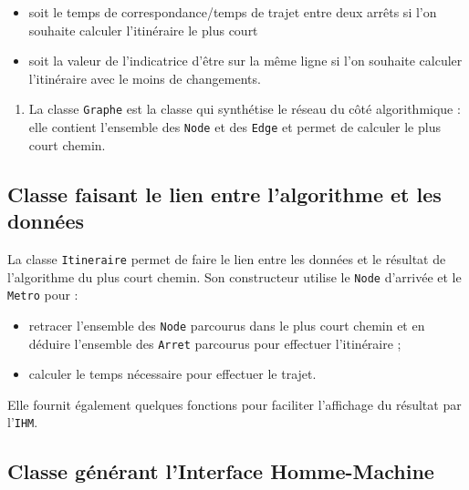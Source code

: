 \documentclass[,french]{article}
\providecommand{\tightlist}{%
  \setlength{\itemsep}{0pt}\setlength{\parskip}{0pt}}
\begin{document}
\begin{itemize}
\tightlist
\item
  soit le temps de correspondance/temps de trajet entre deux arrêts si
  l'on souhaite calculer l'itinéraire le plus court
\item
  soit la valeur de l'indicatrice d'être sur la même ligne si l'on
  souhaite calculer l'itinéraire avec le moins de changements.
\end{itemize}

\begin{enumerate}
\def\labelenumi{\arabic{enumi}.}
\setcounter{enumi}{2}
\tightlist
\item
  La classe \texttt{Graphe} est la classe qui synthétise le réseau du
  côté algorithmique : elle contient l'ensemble des \texttt{Node} et des
  \texttt{Edge} et permet de calculer le plus court chemin.
\end{enumerate}

\hypertarget{classe-faisant-le-lien-entre-lalgorithme-et-les-donnuxe9es}{%
\subsection{Classe faisant le lien entre l'algorithme et les
données}\label{classe-faisant-le-lien-entre-lalgorithme-et-les-donnuxe9es}}

La classe \texttt{Itineraire} permet de faire le lien entre les données
et le résultat de l'algorithme du plus court chemin. Son constructeur
utilise le \texttt{Node} d'arrivée et le \texttt{Metro} pour :

\begin{itemize}
\item
  retracer l'ensemble des \texttt{Node} parcourus dans le plus court
  chemin et en déduire l'ensemble des \texttt{Arret} parcourus pour
  effectuer l'itinéraire ;
\item
  calculer le temps nécessaire pour effectuer le trajet.
\end{itemize}

Elle fournit également quelques fonctions pour faciliter l'affichage du
résultat par l'\texttt{IHM}.

\hypertarget{classe-guxe9nuxe9rant-linterface-homme-machine}{%
\subsection{Classe générant l'Interface
Homme-Machine}\label{classe-guxe9nuxe9rant-linterface-homme-machine}}
\end{document}
